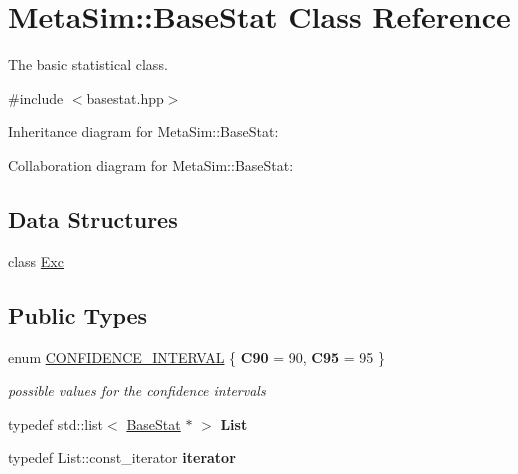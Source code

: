 \hypertarget{classMetaSim_1_1BaseStat}{}\section{Meta\+Sim\+:\+:Base\+Stat Class Reference}
\label{classMetaSim_1_1BaseStat}


The basic statistical class.  




{\ttfamily \#include $<$basestat.\+hpp$>$}



Inheritance diagram for Meta\+Sim\+:\+:Base\+Stat\+:


Collaboration diagram for Meta\+Sim\+:\+:Base\+Stat\+:
\subsection*{Data Structures}
\begin{DoxyCompactItemize}
\item 
class \hyperlink{classMetaSim_1_1BaseStat_1_1Exc}{Exc}
\end{DoxyCompactItemize}
\subsection*{Public Types}
\begin{DoxyCompactItemize}
\item 
enum \hyperlink{group__metasim__stat_ga4d14ae31bff47d98dc795b118c8b2ccd}{C\+O\+N\+F\+I\+D\+E\+N\+C\+E\+\_\+\+I\+N\+T\+E\+R\+V\+AL} \{ {\bfseries C90} = 90, 
{\bfseries C95} = 95
 \}\hypertarget{group__metasim__stat_ga4d14ae31bff47d98dc795b118c8b2ccd}{}\label{group__metasim__stat_ga4d14ae31bff47d98dc795b118c8b2ccd}
\begin{DoxyCompactList}\small\item\em possible values for the confidence intervals \end{DoxyCompactList}
\item 
typedef std\+::list$<$ \hyperlink{classMetaSim_1_1BaseStat}{Base\+Stat} $\ast$ $>$ {\bfseries List}
\item 
typedef List\+::const\+\_\+iterator {\bfseries iterator}
\end{DoxyCompactItemize}
